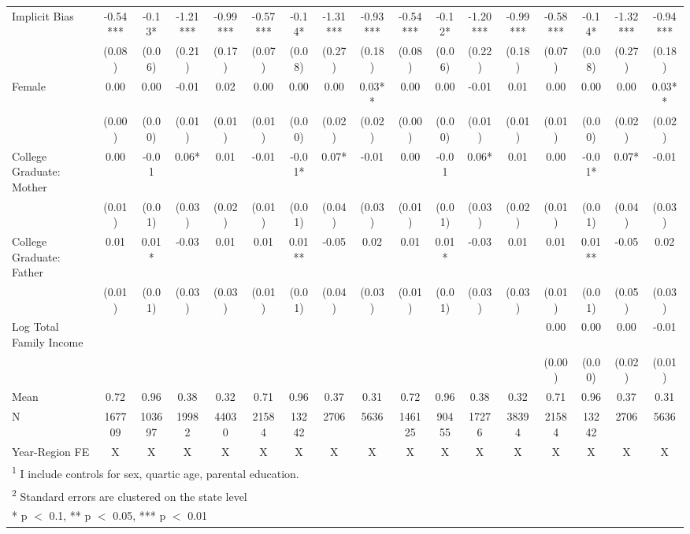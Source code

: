 \begin{landscape}
\begin{table}[!h]
{\begin{tabular}[t]{lcccccccccccccccc}
\midrule
Implicit Bias & -0.54*** & -0.13* & -1.21*** & -0.99*** & -0.57*** & -0.14* & -1.31*** & -0.93*** & -0.54*** & -0.12* & -1.20*** & -0.99*** & -0.58*** & -0.14* & -1.32*** & -0.94***\\
 & (0.08) & (0.06) & (0.21) & (0.17) & (0.07) & (0.08) & (0.27) & (0.18) & (0.08) & (0.06) & (0.22) & (0.18) & (0.07) & (0.08) & (0.27) & (0.18)\\
Female & 0.00 & 0.00 & -0.01 & 0.02 & 0.00 & 0.00 & 0.00 & 0.03** & 0.00 & 0.00 & -0.01 & 0.01 & 0.00 & 0.00 & 0.00 & 0.03**\\
 & (0.00) & (0.00) & (0.01) & (0.01) & (0.01) & (0.00) & (0.02) & (0.02) & (0.00) & (0.00) & (0.01) & (0.01) & (0.01) & (0.00) & (0.02) & (0.02)\\
College Graduate: Mother & 0.00 & -0.01 & 0.06* & 0.01 & -0.01 & -0.01* & 0.07* & -0.01 & 0.00 & -0.01 & 0.06* & 0.01 & 0.00 & -0.01* & 0.07* & -0.01\\
 & (0.01) & (0.01) & (0.03) & (0.02) & (0.01) & (0.01) & (0.04) & (0.03) & (0.01) & (0.01) & (0.03) & (0.02) & (0.01) & (0.01) & (0.04) & (0.03)\\
College Graduate: Father & 0.01 & 0.01* & -0.03 & 0.01 & 0.01 & 0.01** & -0.05 & 0.02 & 0.01 & 0.01* & -0.03 & 0.01 & 0.01 & 0.01** & -0.05 & 0.02\\
 & (0.01) & (0.01) & (0.03) & (0.03) & (0.01) & (0.01) & (0.04) & (0.03) & (0.01) & (0.01) & (0.03) & (0.03) & (0.01) & (0.01) & (0.05) & (0.03)\\
Log Total Family Income &  &  &  &  &  &  &  &  &  &  &  &  & 0.00 & 0.00 & 0.00 & -0.01\\
 &  &  &  &  &  &  &  &  &  &  &  &  & (0.00) & (0.00) & (0.02) & (0.01)\\
\midrule
Mean & 0.72 & 0.96 & 0.38 & 0.32 & 0.71 & 0.96 & 0.37 & 0.31 & 0.72 & 0.96 & 0.38 & 0.32 & 0.71 & 0.96 & 0.37 & 0.31\\
N & 167709 & 103697 & 19982 & 44030 & 21584 & 13242 & 2706 & 5636 & 146125 & 90455 & 17276 & 38394 & 21584 & 13242 & 2706 & 5636\\
Year-Region FE & X & X & X & X & X & X & X & X & X & X & X & X & X & X & X & X\\
\bottomrule
\multicolumn{17}{l}{\rule{0pt}{1em}\textsuperscript{1} I include controls for sex, quartic age, parental education.}\\
\multicolumn{17}{l}{\rule{0pt}{1em}\textsuperscript{2} Standard errors are clustered on the state level}\\
\multicolumn{17}{l}{\rule{0pt}{1em}* p $<$ 0.1, ** p $<$ 0.05, *** p $<$ 0.01}\\
\end{tabular}}
\end{table}
\end{landscape}
